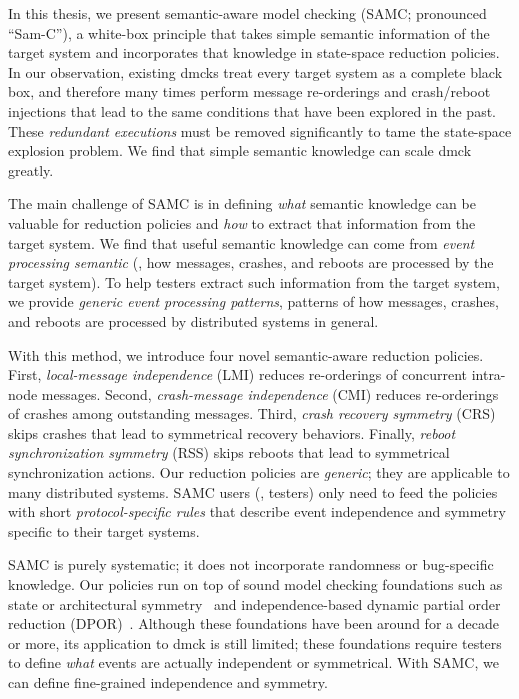 
In this thesis, we present semantic-aware model checking (SAMC;
pronounced ``Sam-C''), a white-box principle that takes simple semantic
information of the target system and incorporates that knowledge in
state-space reduction policies.    In our
observation, existing dmcks treat every target system as a complete
black box, and therefore many times perform message re-orderings and
crash/reboot injections that lead to the same conditions that have
been explored in the past.  These {\em redundant executions} must be
removed significantly to tame the state-space explosion problem.  
We find that simple semantic knowledge can
scale dmck greatly.

The main challenge of SAMC is in defining {\em what} semantic
knowledge can be valuable for reduction policies and {\em how} to
extract that information from the target system.  We find that useful
semantic knowledge can come from {\em event processing semantic}
(\ie, how messages, crashes, and reboots are processed by the
target system).  To help testers extract such information from
the target system, we provide {\em generic event processing patterns},
patterns of how messages, crashes, and reboots are processed by
distributed systems in general.


With this method, we introduce four novel semantic-aware reduction
policies.  First, {\em local-message independence} (LMI) reduces
re-orderings of concurrent intra-node messages.  Second, {\em
crash-message independence} (CMI) reduces re-orderings of crashes
among outstanding messages.  Third, {\em crash recovery symmetry}
(CRS) skips crashes that lead to symmetrical recovery
behaviors.  Finally, {\em reboot synchronization
symmetry} (RSS) skips reboots that lead to symmetrical
synchronization actions.  Our reduction policies are {\em generic};
they are applicable to many distributed systems.  SAMC users
(\ie, testers) only need to feed
the policies with short {\em protocol-specific rules} that
describe event independence and symmetry specific to their target
systems.


SAMC is purely systematic; it does not incorporate randomness or
bug-specific knowledge.  Our policies run on top of sound model
checking foundations such as state or architectural
symmetry~\cite{Clarke+98-SymReduct, Prasad+00-SymBasedMc} and
independence-based dynamic partial order reduction
(DPOR)~\cite{Flanagan+05-Dpor, Godefroid+96-Dpor}.  Although these
foundations have been around for a decade or more, its application to
dmck is still limited; these foundations require testers to define
{\em what} events are actually independent or symmetrical.  With SAMC,
we can define fine-grained independence and symmetry.


